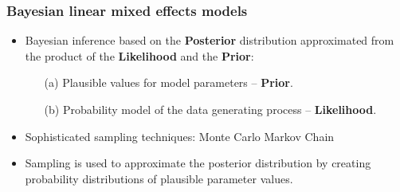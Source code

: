 \begin{frame}
	\frametitle{Bayesian linear mixed effects models}
	
	\begin{itemize}
		\item Bayesian inference based on the \textbf{Posterior} distribution approximated from the product of the \textbf{Likelihood} and the \textbf{Prior}:

		\begin{itemize}
		\item[(a)] Plausible values for model parameters -- \textbf{Prior}.
		\item[(b)] Probability model of the data generating process -- \textbf{Likelihood}.

	\end{itemize}
		\item Sophisticated sampling techniques: Monte Carlo Markov Chain
		
		\item Sampling is used to approximate the posterior distribution by creating probability distributions of plausible parameter values.
	\end{itemize}
\end{frame}




